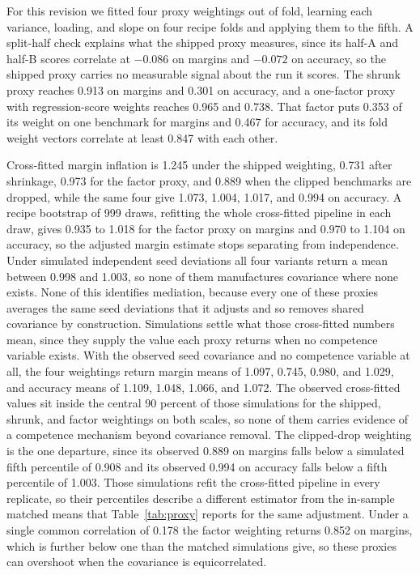 For this revision we fitted four proxy weightings out of fold, learning each variance, loading, and slope on four recipe folds and applying them to the fifth. A split-half check explains what the shipped proxy measures, since its half-A and half-B scores correlate at $-0.086$ on margins and $-0.072$ on accuracy, so the shipped proxy carries no measurable signal about the run it scores. The shrunk proxy reaches 0.913 on margins and 0.301 on accuracy, and a one-factor proxy with regression-score weights reaches 0.965 and 0.738. That factor puts 0.353 of its weight on one benchmark for margins and 0.467 for accuracy, and its fold weight vectors correlate at least 0.847 with each other.

Cross-fitted margin inflation is 1.245 under the shipped weighting, 0.731 after shrinkage, 0.973 for the factor proxy, and 0.889 when the clipped benchmarks are dropped, while the same four give 1.073, 1.004, 1.017, and 0.994 on accuracy. A recipe bootstrap of 999 draws, refitting the whole cross-fitted pipeline in each draw, gives 0.935 to 1.018 for the factor proxy on margins and 0.970 to 1.104 on accuracy, so the adjusted margin estimate stops separating from independence. Under simulated independent seed deviations all four variants return a mean between 0.998 and 1.003, so none of them manufactures covariance where none exists. None of this identifies mediation, because every one of these proxies averages the same seed deviations that it adjusts and so removes shared covariance by construction. Simulations settle what those cross-fitted numbers mean, since they supply the value each proxy returns when no competence variable exists. With the observed seed covariance and no competence variable at all, the four weightings return margin means of 1.097, 0.745, 0.980, and 1.029, and accuracy means of 1.109, 1.048, 1.066, and 1.072. The observed cross-fitted values sit inside the central 90 percent of those simulations for the shipped, shrunk, and factor weightings on both scales, so none of them carries evidence of a competence mechanism beyond covariance removal. The clipped-drop weighting is the one departure, since its observed 0.889 on margins falls below a simulated fifth percentile of 0.908 and its observed 0.994 on accuracy falls below a fifth percentile of 1.003. Those simulations refit the cross-fitted pipeline in every replicate, so their percentiles describe a different estimator from the in-sample matched means that Table~\ref{tab:proxy} reports for the same adjustment. Under a single common correlation of 0.178 the factor weighting returns 0.852 on margins, which is further below one than the matched simulations give, so these proxies can overshoot when the covariance is equicorrelated.

